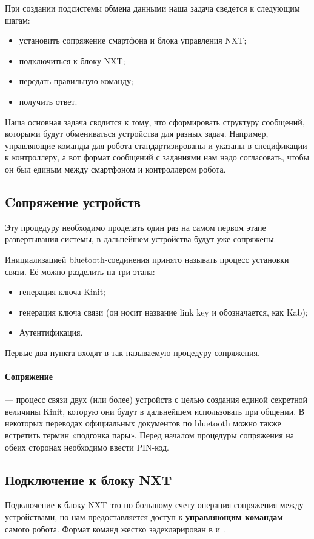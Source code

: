 При создании подсистемы обмена данными наша задача сведется к следующим шагам:
\begin{itemize}
 \item установить сопряжение смартфона и блока управления NXT;
 \item подключиться к блоку NXT;
 \item передать правильную команду;
 \item получить ответ.
\end{itemize}

Наша основная задача сводится к тому, что сформировать структуру сообщений, которыми будут обмениваться устройства для разных задач.
Например, управляющие команды для робота стандартизированы и указаны в спецификации к контроллеру, а вот формат сообщений с заданиями нам надо согласовать, чтобы он был единым между смартфоном и контроллером робота.

\subsection{Cопряжение устройств}
Эту процедуру необходимо проделать один раз на самом первом этапе развертывания системы, в дальнейшем устройства будут уже сопряжены.

Инициализацией bluetooth-соединения принято называть процесс установки связи. Её можно разделить на три этапа:

\begin{itemize}
 \item генерация ключа Kinit;
 \item генерация ключа связи (он носит название link key и обозначается, как Kab);
 \item Аутентификация.
\end{itemize}

Первые два пункта входят в так называемую процедуру сопряжения.

\paragraph{Сопряжение}  — процесс связи двух (или более) устройств с целью создания единой секретной величины Kinit, которую они будут в дальнейшем использовать при общении. В некоторых переводах официальных документов по bluetooth можно также встретить термин «подгонка пары». Перед началом процедуры сопряжения на обеих сторонах необходимо ввести PIN-код.

\subsection{Подключение к блоку NXT}
Подключение к блоку NXT это по большому счету операция сопряжения между устройствами, но нам предоставляется доступ к \textbf{управляющим командам} самого робота.
Формат команд жестко задекларирован  в \cite{Pup09} и \cite{Pup10}. 

